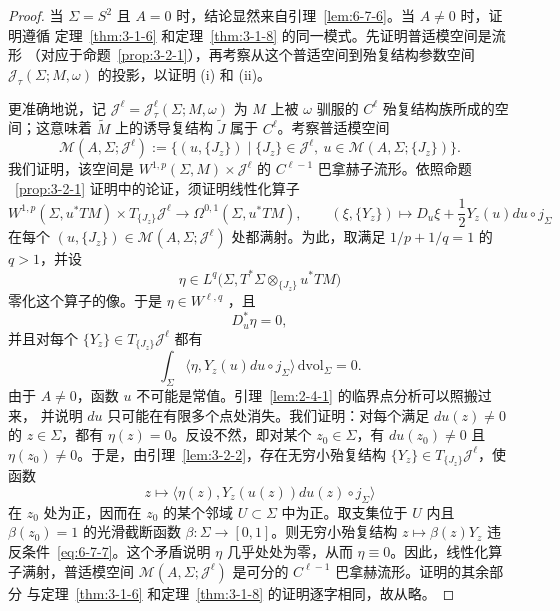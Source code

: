 \begin{proof}
当 $\Sigma=S^2$ 且 $A=0$ 时，结论显然来自引理~\ref{lem:6-7-6}。当 $A\ne0$ 时，证明遵循
定理~\ref{thm:3-1-6} 和定理~\ref{thm:3-1-8} 的同一模式。先证明普适模空间是流形
（对应于命题~\ref{prop:3-2-1}），再考察从这个普适空间到殆复结构参数空间
$\mathcal J_\tau(\Sigma;M,\omega)$ 的投影，以证明 (i) 和 (ii)。

更准确地说，记 $\mathcal J^\ell=\mathcal J_\tau^\ell(\Sigma;M,\omega)$ 为 $M$ 上被
$\omega$ 驯服的 $C^\ell$ 殆复结构族所成的空间；这意味着 $\widetilde M$ 上的诱导复结构
$\widetilde J$ 属于 $C^\ell$。考察普适模空间
\[
  \mathcal M(A,\Sigma;\mathcal J^\ell)
  :=\bigl\{(u,\{J_z\})\mid \{J_z\}\in\mathcal J^\ell,
      \ u\in\mathcal M(A,\Sigma;\{J_z\})\bigr\}.
\]
我们证明，该空间是
$W^{1,p}(\Sigma,M)\times\mathcal J^\ell$ 的 $C^{\ell-1}$ 巴拿赫子流形。依照命题
~\ref{prop:3-2-1} 证明中的论证，须证明线性化算子
\[
  W^{1,p}(\Sigma,u^*TM)\times T_{\{J_z\}}\mathcal J^\ell
  \longrightarrow\Omega^{0,1}(\Sigma,u^*TM),
  \qquad
  (\xi,\{Y_z\})\longmapsto
  D_u\xi+\frac12Y_z(u)du\circ j_\Sigma
\]
在每个 $(u,\{J_z\})\in\mathcal M(A,\Sigma;\mathcal J^\ell)$ 处都满射。为此，取满足
$1/p+1/q=1$ 的 $q>1$，并设
\[
  \eta\in L^q\bigl(\Sigma,T^*\Sigma\otimes_{\{J_z\}}u^*TM\bigr)
\]
零化这个算子的像。于是 $\eta\in W^{\ell,q}$
，且
\[
  D_u^*\eta=0,
\]
并且对每个 $\{Y_z\}\in T_{\{J_z\}}\mathcal J^\ell$ 都有
\begin{equation}\label{eq:6-7-7}
  \int_\Sigma\bigl\langle\eta,Y_z(u)du\circ j_\Sigma\bigr\rangle
  \,\mathrm{dvol}_\Sigma=0.
\end{equation}
由于 $A\ne0$，函数 $u$ 不可能是常值。引理~\ref{lem:2-4-1} 的临界点分析可以照搬过来，
并说明 $du$ 只可能在有限多个点处消失。我们证明：对每个满足 $du(z)\ne0$ 的
$z\in\Sigma$，都有 $\eta(z)=0$。反设不然，即对某个 $z_0\in\Sigma$，有
$du(z_0)\ne0$ 且 $\eta(z_0)\ne0$。于是，由引理~\ref{lem:3-2-2}，存在无穷小殆复结构
$\{Y_z\}\in T_{\{J_z\}}\mathcal J^\ell$，使函数
\[
  z\longmapsto\bigl\langle\eta(z),Y_z(u(z))du(z)\circ j_\Sigma\bigr\rangle
\]
在 $z_0$ 处为正，因而在 $z_0$ 的某个邻域 $U\subset\Sigma$ 中为正。取支集位于 $U$ 内且
$\beta(z_0)=1$ 的光滑截断函数 $\beta:\Sigma\to[0,1]$。则无穷小殆复结构
$z\mapsto\beta(z)Y_z$ 违反条件~\eqref{eq:6-7-7}。这个矛盾说明 $\eta$ 几乎处处为零，从而
$\eta\equiv0$。因此，线性化算子满射，普适模空间
$\mathcal M(A,\Sigma;\mathcal J^\ell)$ 是可分的 $C^{\ell-1}$ 巴拿赫流形。证明的其余部分
与定理~\ref{thm:3-1-6} 和定理~\ref{thm:3-1-8} 的证明逐字相同，故从略。
\end{proof}

